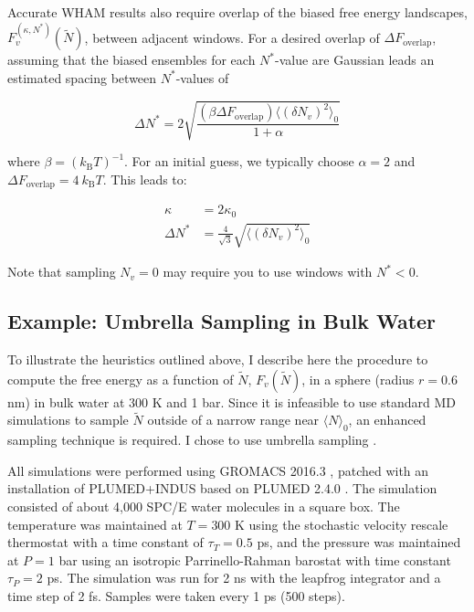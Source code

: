 \documentclass[11pt,notitlepage]{article}
\newcommand{\kB}{k_{\text{B}}}
\begin{document}
Accurate WHAM results also require overlap of the biased free energy landscapes, $F_v^{(\kappa, N^*)}(\tilde{N})$, between adjacent windows. For a desired overlap of $ \Delta F_{\text{overlap}}$, assuming that the biased ensembles for each $N^*$-value are Gaussian leads an estimated spacing between $N^*$-values of

\begin{equation}
	\Delta N^* = 2 \sqrt{ \frac{(\beta \Delta F_{\text{overlap}}) \langle (\delta N_v)^2 \rangle_0}{1 + \alpha} }
\end{equation}


\noindent where $\beta = (\kB T)^{-1}$. For an initial guess, we typically choose $\alpha = 2$ and $\Delta F_{\text{overlap}} = 4 \ k_{\text{B}} T$. This leads to:

\begin{align}
	\label{eqn:kapparule}
	\kappa &= 2 \kappa_0  \\
	\label{eqn:nstarrule}
	\Delta N^* &= \frac{4}{\sqrt{3}} \sqrt{ \langle (\delta N_v)^2 \rangle_0 }
\end{align}


Note that sampling $N_v = 0$ may require you to use windows with $N^* < 0$.


\subsection{Example: Umbrella Sampling in Bulk Water}

To illustrate the heuristics outlined above, I describe here the procedure to compute the free energy as a function of $\tilde{N}$, $F_v(\tilde{N})$, in a sphere (radius $r = 0.6$ nm) in bulk water at 300 K and 1 bar. Since it is infeasible to use standard MD simulations to sample $\tilde{N}$ outside of a narrow range near $\langle N \rangle_0$, an enhanced sampling technique is required. I chose to use umbrella sampling \cite{Torrie1977,Patel2010}.

All simulations were performed using GROMACS 2016.3 \cite{VanDerSpoel2005}, patched with an installation of PLUMED+INDUS based on PLUMED 2.4.0 \cite{Tribello2014}. The simulation consisted of about 4,000 SPC/E water molecules \cite{Berendsen1987} in a square box. The temperature was maintained at $T = 300$ K using the stochastic velocity rescale thermostat \cite{Bussi2007} with a time constant of $\tau_T = 0.5$ ps, and the pressure was maintained at $P = 1$ bar using an isotropic Parrinello-Rahman barostat \cite{Parrinello1981} with time constant $\tau_P = 2$ ps. The simulation was run for 2 ns with the leapfrog integrator and a time step of 2 fs. Samples were taken every 1 ps (500 steps).
\end{document}
